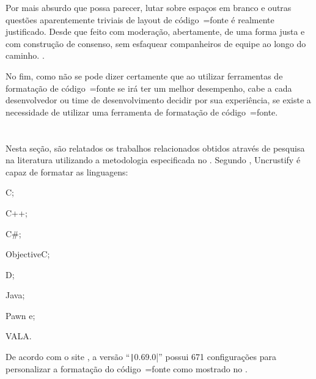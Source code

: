 %
\begin{citacao}
    Por mais absurdo que possa parecer,
    lutar sobre espaços em branco e
    outras questões aparentemente triviais de layout de código~=fonte é realmente justificado.
    Desde que feito com moderação,
    abertamente,
    de uma forma justa e
    com construção de consenso,
    sem esfaquear companheiros de equipe ao longo do caminho.
    \cite[tradução nossa\protect\footnotemark]{deathToTheSpaceInfidels}.
\end{citacao}

No fim,
como não se pode dizer certamente que ao utilizar ferramentas de formatação de código~=fonte se irá ter um melhor desempenho,
cabe a cada desenvolvedor ou
time de desenvolvimento decidir por sua experiência,
se existe a necessidade de utilizar uma ferramenta de formatação de código~=fonte.


\section{}
\label{section:trabalhosRelacionados}

Nesta seção,
são relatados os trabalhos relacionados obtidos através de pesquisa na literatura utilizando a metodologia especificada no .
Segundo ,
Uncrustify é capaz de formatar as linguagens:
\begin{inparaenum}[1)]
\item C;
\item C++;
\item C\#;
\item ObjectiveC;
\item D;
\item Java;
\item Pawn e;
\item VALA.
\end{inparaenum}%
De acordo com o site ,
a versão ``\texttt|0.69.0|'' possui 671 configurações para personalizar a formatação do código~=fonte como mostrado no .

